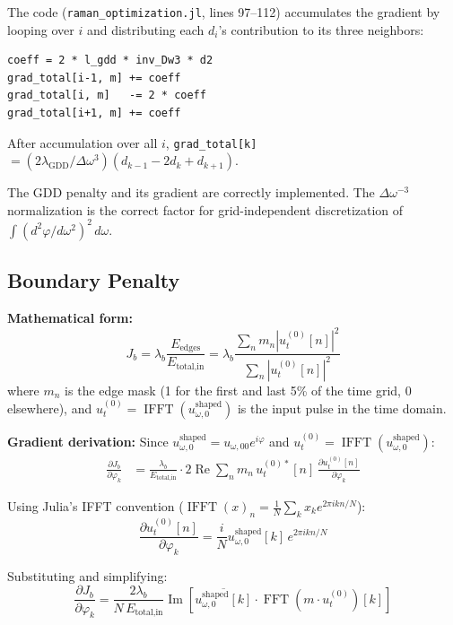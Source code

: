 \documentclass[12pt,a4paper]{article}
\newcommand{\pdv}[2]{\frac{\partial #1}{\partial #2}}
\newcommand{\Real}{\operatorname{Re}}
\newcommand{\Imag}{\operatorname{Im}}
\newcommand{\FFT}{\operatorname{FFT}}
\newcommand{\IFFT}{\operatorname{IFFT}}
\theoremstyle{definition}
\begin{document}
The code (\texttt{raman\_optimization.jl}, lines 97--112) accumulates the gradient by looping over $i$ and distributing each $d_i$'s contribution to its three neighbors:
\begin{lstlisting}
coeff = 2 * l_gdd * inv_Dw3 * d2
grad_total[i-1, m] += coeff
grad_total[i, m]   -= 2 * coeff
grad_total[i+1, m] += coeff
\end{lstlisting}

After accumulation over all $i$, \texttt{grad\_total[k]} $= (2\lambda_{\text{GDD}}/\Delta\omega^3)(d_{k-1} - 2d_k + d_{k+1})$.

\begin{verified}
The GDD penalty and its gradient are correctly implemented. The $\Delta\omega^{-3}$ normalization is the correct factor for grid-independent discretization of $\int(d^2\varphi/d\omega^2)^2\,d\omega$.
\end{verified}

\subsection{Boundary Penalty}

\textbf{Mathematical form:}
\begin{equation}
J_b = \lambda_b \frac{E_{\text{edges}}}{E_{\text{total,in}}} = \lambda_b \frac{\sum_n m_n |u_t^{(0)}[n]|^2}{\sum_n |u_t^{(0)}[n]|^2}
\end{equation}
where $m_n$ is the edge mask (1 for the first and last 5\% of the time grid, 0 elsewhere), and $u_t^{(0)} = \IFFT(u_{\omega,0}^{\text{shaped}})$ is the input pulse in the time domain.

\textbf{Gradient derivation:} Since $u_{\omega,0}^{\text{shaped}} = u_{\omega,00}e^{i\varphi}$ and $u_t^{(0)} = \IFFT(u_{\omega,0}^{\text{shaped}})$:
\begin{align}
\pdv{J_b}{\varphi_k} &= \frac{\lambda_b}{E_{\text{total,in}}} \cdot 2\Real\!\sum_n m_n\, u_t^{(0)*}[n]\,\pdv{u_t^{(0)}[n]}{\varphi_k}
\end{align}

Using Julia's IFFT convention ($\IFFT(x)_n = \frac{1}{N}\sum_k x_k e^{2\pi ikn/N}$):
\begin{equation}
\pdv{u_t^{(0)}[n]}{\varphi_k} = \frac{i}{N} u_{\omega,0}^{\text{shaped}}[k]\, e^{2\pi ikn/N}
\end{equation}

Substituting and simplifying:
\begin{equation}
\pdv{J_b}{\varphi_k} = \frac{2\lambda_b}{N\,E_{\text{total,in}}} \Imag\!\left[\overline{u_{\omega,0}^{\text{shaped}}[k]} \cdot \FFT(m \cdot u_t^{(0)})[k]\right]
\end{equation}
\end{document}
